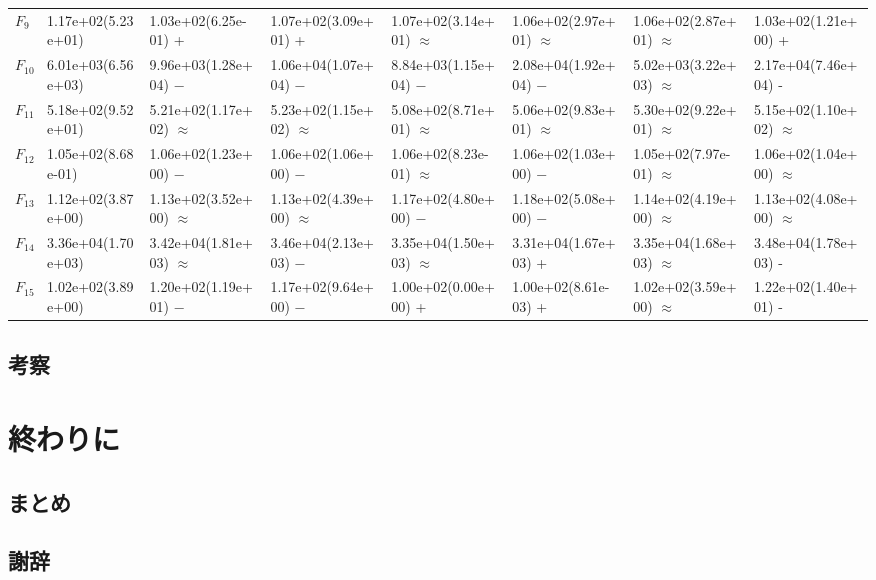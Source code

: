 \documentclass[a4paper,11pt,oneside,openany]{jsbook}
\begin{document}
\begin{landscape}
\begin{table}[!tbp]
\begin{center}
\begin{tabular}{llllllll}
$F_{9}$&1.17e+02(5.23e+01)&1.03e+02(6.25e-01) +&1.07e+02(3.09e+01) +&1.07e+02(3.14e+01) $\approx$&1.06e+02(2.97e+01) $\approx$&1.06e+02(2.87e+01) $\approx$&1.03e+02(1.21e+00) +\tabularnewline
$F_{10}$&6.01e+03(6.56e+03)&9.96e+03(1.28e+04) −&1.06e+04(1.07e+04) −&8.84e+03(1.15e+04) −&2.08e+04(1.92e+04) −&5.02e+03(3.22e+03) $\approx$&2.17e+04(7.46e+04) -\tabularnewline
$F_{11}$&5.18e+02(9.52e+01)&5.21e+02(1.17e+02) $\approx$&5.23e+02(1.15e+02) $\approx$&5.08e+02(8.71e+01) $\approx$&5.06e+02(9.83e+01) $\approx$&5.30e+02(9.22e+01) $\approx$&5.15e+02(1.10e+02) $\approx$\tabularnewline
$F_{12}$&1.05e+02(8.68e-01)&1.06e+02(1.23e+00) −&1.06e+02(1.06e+00) −&1.06e+02(8.23e-01) $\approx$&1.06e+02(1.03e+00) −&1.05e+02(7.97e-01) $\approx$&1.06e+02(1.04e+00) $\approx$\tabularnewline
$F_{13}$&1.12e+02(3.87e+00)&1.13e+02(3.52e+00) $\approx$&1.13e+02(4.39e+00) $\approx$&1.17e+02(4.80e+00) −&1.18e+02(5.08e+00) −&1.14e+02(4.19e+00) $\approx$&1.13e+02(4.08e+00) $\approx$\tabularnewline
$F_{14}$&3.36e+04(1.70e+03)&3.42e+04(1.81e+03) $\approx$&3.46e+04(2.13e+03) −&3.35e+04(1.50e+03) $\approx$&3.31e+04(1.67e+03) +&3.35e+04(1.68e+03) $\approx$&3.48e+04(1.78e+03) -\tabularnewline
$F_{15}$&1.02e+02(3.89e+00)&1.20e+02(1.19e+01) −&1.17e+02(9.64e+00) −&1.00e+02(0.00e+00) +&1.00e+02(8.61e-03) +&1.02e+02(3.59e+00) $\approx$&1.22e+02(1.40e+01) -\tabularnewline
\hline
\end{tabular}\end{center}

\end{table}
\end{landscape}


\section{考察}



\chapter{終わりに}
\section{まとめ}
\section{謝辞}
\end{document}
